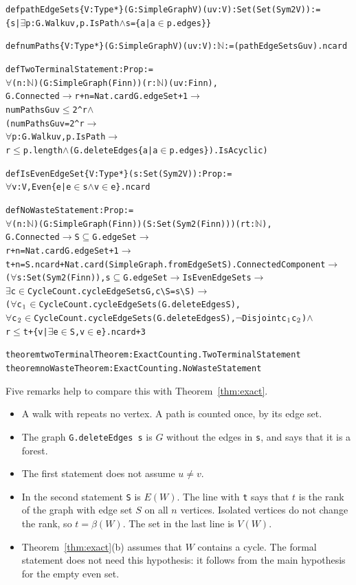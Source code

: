 {\small
\begin{alltt}
def pathEdgeSets \{V : Type*\} (G : SimpleGraph V) (u v : V) : Set (Set (Sym2 V)) :=
  \{s | \(\exists\) p : G.Walk u v, p.IsPath \(\land\) s = \{a | a \(\in\) p.edges\}\}

def numPaths \{V : Type*\} (G : SimpleGraph V) (u v : V) : \(\mathbb{N}\) := (pathEdgeSets G u v).ncard

def TwoTerminalStatement : Prop :=
  \(\forall\) (n : \(\mathbb{N}\)) (G : SimpleGraph (Fin n)) (r : \(\mathbb{N}\)) (u v : Fin n),
    G.Connected \(\to\) r + n = Nat.card G.edgeSet + 1 \(\to\)
      numPaths G u v \(\le\) 2 ^ r \(\land\)
      (numPaths G u v = 2 ^ r \(\to\)
        \(\forall\) p : G.Walk u v, p.IsPath \(\to\)
          r \(\le\) p.length \(\land\) (G.deleteEdges \{a | a \(\in\) p.edges\}).IsAcyclic)

def IsEvenEdgeSet \{V : Type*\} (s : Set (Sym2 V)) : Prop :=
  \(\forall\) v : V, Even \{e | e \(\in\) s \(\land\) v \(\in\) e\}.ncard

def NoWasteStatement : Prop :=
  \(\forall\) (n : \(\mathbb{N}\)) (G : SimpleGraph (Fin n)) (S : Set (Sym2 (Fin n))) (r t : \(\mathbb{N}\)),
    G.Connected \(\to\) S \(\subseteq\) G.edgeSet \(\to\)
    r + n = Nat.card G.edgeSet + 1 \(\to\)
    t + n = S.ncard + Nat.card (SimpleGraph.fromEdgeSet S).ConnectedComponent \(\to\)
    (\(\forall\) s : Set (Sym2 (Fin n)), s \(\subseteq\) G.edgeSet \(\to\) IsEvenEdgeSet s \(\to\)
      \(\exists\) c \(\in\) CycleCount.cycleEdgeSets G, c \textbackslash{} S = s \textbackslash{} S) \(\to\)
    (\(\forall\) c\(\sb{1}\) \(\in\) CycleCount.cycleEdgeSets (G.deleteEdges S),
      \(\forall\) c\(\sb{2}\) \(\in\) CycleCount.cycleEdgeSets (G.deleteEdges S), \(\lnot\) Disjoint c\(\sb{1}\) c\(\sb{2}\)) \(\land\)
    r \(\le\) t + \{v | \(\exists\) e \(\in\) S, v \(\in\) e\}.ncard + 3

theorem twoTerminalTheorem : ExactCounting.TwoTerminalStatement
theorem noWasteTheorem : ExactCounting.NoWasteStatement
\end{alltt}}

Five remarks help to compare this with Theorem~\ref{thm:exact}.
\begin{itemize}
\item A walk with  repeats no vertex. A path is counted once, by its edge set.
\item The graph \texttt{G.deleteEdges s} is $G$ without the edges in \texttt{s}, and
 says that it is a forest.
\item The first statement does not assume $u\ne v$.
\item In the second statement \texttt{S} is $E(W)$. The line with \texttt{t} says that $t$ is the
rank of the graph with edge set $S$ on all $n$ vertices. Isolated vertices do not change the rank,
so $t=\beta(W)$. The set in the last line is $V(W)$.
\item Theorem~\ref{thm:exact}(b) assumes that $W$ contains a cycle. The formal statement does not
need this hypothesis: it follows from the main hypothesis for the empty even set.
\end{itemize}

